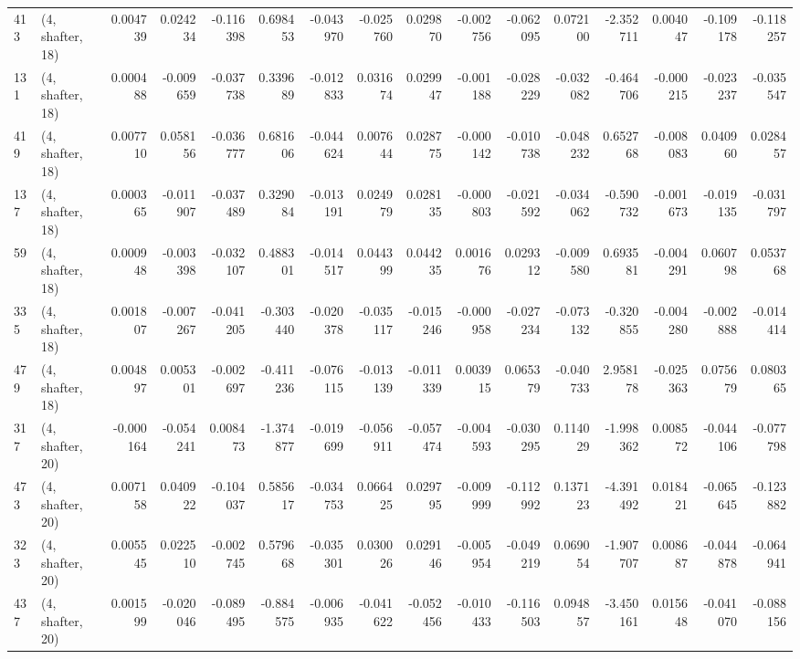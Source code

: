 \begin{tabular}{llrrrrrrrrrrrrrr}
413 &  (4, shafter, 18) &   0.004739 &  0.024234 & -0.116398 &    0.698453 & -0.043970 &  -0.025760 &  0.029870 & -0.002756 & -0.062095 &  0.072100 &   -2.352711 &  0.004047 & -0.109178 & -0.118257 \\
131 &  (4, shafter, 18) &   0.000488 & -0.009659 & -0.037738 &    0.339689 & -0.012833 &   0.031674 &  0.029947 & -0.001188 & -0.028229 & -0.032082 &   -0.464706 & -0.000215 & -0.023237 & -0.035547 \\
419 &  (4, shafter, 18) &   0.007710 &  0.058156 & -0.036777 &    0.681606 & -0.044624 &   0.007644 &  0.028775 & -0.000142 & -0.010738 & -0.048232 &    0.652768 & -0.008083 &  0.040960 &  0.028457 \\
137 &  (4, shafter, 18) &   0.000365 & -0.011907 & -0.037489 &    0.329084 & -0.013191 &   0.024979 &  0.028135 & -0.000803 & -0.021592 & -0.034062 &   -0.590732 & -0.001673 & -0.019135 & -0.031797 \\
59  &  (4, shafter, 18) &   0.000948 & -0.003398 & -0.032107 &    0.488301 & -0.014517 &   0.044399 &  0.044235 &  0.001676 &  0.029312 & -0.009580 &    0.693581 & -0.004291 &  0.060798 &  0.053768 \\
335 &  (4, shafter, 18) &   0.001807 & -0.007267 & -0.041205 &   -0.303440 & -0.020378 &  -0.035117 & -0.015246 & -0.000958 & -0.027234 & -0.073132 &   -0.320855 & -0.004280 & -0.002888 & -0.014414 \\
479 &  (4, shafter, 18) &   0.004897 &  0.005301 & -0.002697 &   -0.411236 & -0.076115 &  -0.013139 & -0.011339 &  0.003915 &  0.065379 & -0.040733 &    2.958178 & -0.025363 &  0.075679 &  0.080365 \\
317 &  (4, shafter, 20) &  -0.000164 & -0.054241 &  0.008473 &   -1.374877 & -0.019699 &  -0.056911 & -0.057474 & -0.004593 & -0.030295 &  0.114029 &   -1.998362 &  0.008572 & -0.044106 & -0.077798 \\
473 &  (4, shafter, 20) &   0.007158 &  0.040922 & -0.104037 &    0.585617 & -0.034753 &   0.066425 &  0.029795 & -0.009999 & -0.112992 &  0.137123 &   -4.391492 &  0.018421 & -0.065645 & -0.123882 \\
323 &  (4, shafter, 20) &   0.005545 &  0.022510 & -0.002745 &    0.579668 & -0.035301 &   0.030026 &  0.029146 & -0.005954 & -0.049219 &  0.069054 &   -1.907707 &  0.008687 & -0.044878 & -0.064941 \\
437 &  (4, shafter, 20) &   0.001599 & -0.020046 & -0.089495 &   -0.884575 & -0.006935 &  -0.041622 & -0.052456 & -0.010433 & -0.116503 &  0.094857 &   -3.450161 &  0.015648 & -0.041070 & -0.088156 \\

\end{tabular}

